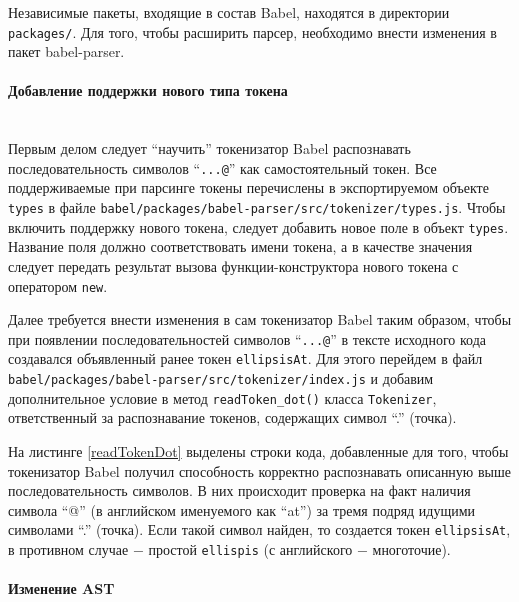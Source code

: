 \documentclass[14pt, a4paper]{article}
\def\code#1{\texttt{#1}} %
\begin{document}
Независимые пакеты, входящие в состав Babel, находятся в директории \code{packages/}. Для того, чтобы 
расширить парсер, необходимо внести изменения в пакет babel-parser.

\paragraph{Добавление поддержки нового типа токена} \mbox{}\\

Первым делом следует ``научить'' токенизатор Babel распознавать последовательность символов ``\code{...@}'' 
как самостоятельный токен. Все поддерживаемые при парсинге токены перечислены в экспортируемом объекте 
\code{types} в файле \code{babel/packages/babel-parser/src/tokenizer/types.js}. Чтобы включить поддержку нового токена,
следует добавить новое поле в объект \code{types}. Название поля должно соответствовать имени токена, а
в качестве значения следует передать результат вызова функции-конструктора нового токена с оператором \code{new}. 



Далее требуется внести изменения в сам токенизатор Babel таким образом, чтобы при появлении последовательностей символов 
``\code{...@}'' в тексте исходного кода создавался объявленный ранее токен \code{ellipsisAt}. Для этого 
перейдем в файл \code{babel/packages/babel-parser/src/tokenizer/index.js} и
добавим дополнительное условие в метод \code{readToken\_dot()} класса \code{Tokenizer}, ответственный за распознавание токенов,
содержащих символ ``.'' (точка).


На листинге \ref{readTokenDot} выделены строки кода, добавленные для того, чтобы токенизатор Babel 
получил способность корректно распознавать описанную выше последовательность символов. В них происходит 
проверка на факт наличия символа ``@'' (в английском именуемого как ``at'') за тремя подряд идущими  
символами ``.'' (точка). Если такой символ найден, то создается токен \code{ellipsisAt}, в противном случае
$-$ простой \code{ellispis} (с английского $-$ многоточие).

\paragraph{Изменение AST} \mbox{}\\
\end{document}
